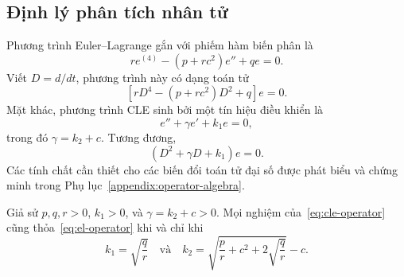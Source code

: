 ﻿\documentclass[12pt]{article}
\begin{document}
\subsection{Định lý phân tích nhân tử}
Phương trình Euler--Lagrange gắn với phiếm hàm biến phân là
\[
 re^{(4)} - (p + rc^2)e'' + qe = 0.
\]
Viết $D = d/dt$, phương trình này có dạng toán tử
\begin{equation}\label{eq:el-operator}
 \left[rD^4 - (p + rc^2)D^2 + q\right]e = 0.
\end{equation}
Mặt khác, phương trình CLE sinh bởi một tín hiệu điều khiển là
\[
 e'' + \gamma e' + k_1e = 0,
\]
trong đó $\gamma = k_2 + c$. Tương đương,
\begin{equation}\label{eq:cle-operator}
 (D^2 + \gamma D + k_1)e = 0.
\end{equation}
Các tính chất cần thiết cho các biến đổi toán tử đại số được phát biểu và chứng minh trong Phụ lục~\ref{appendix:operator-algebra}.

\begin{theorem}\label{factor}
Giả sử $p, q, r > 0$, $k_1 > 0$, và $\gamma = k_2 + c > 0$.
Mọi nghiệm của~\eqref{eq:cle-operator} cũng thỏa~\eqref{eq:el-operator} khi và chỉ khi
\[
 k_1 = \sqrt{\frac{q}{r}} \quad \text{và}\quad k_2 = \sqrt{ \frac{p}{r} + c^2 + 2\sqrt{\frac{q}{r}} } - c.
\]
\end{theorem}
\end{document}
